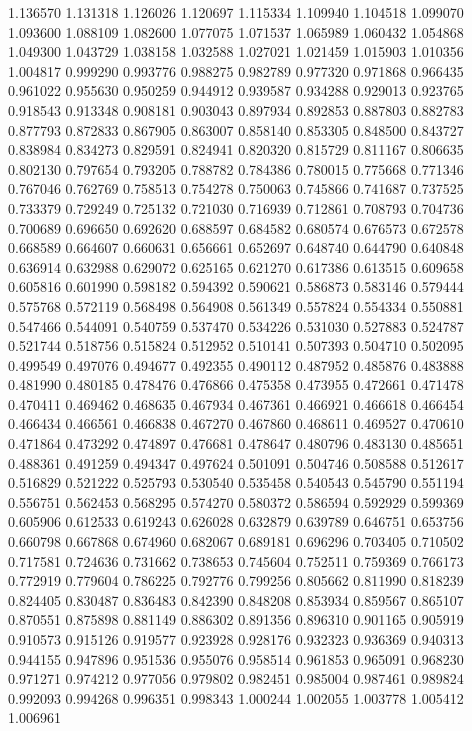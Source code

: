 1.136570
1.131318
1.126026
1.120697
1.115334
1.109940
1.104518
1.099070
1.093600
1.088109
1.082600
1.077075
1.071537
1.065989
1.060432
1.054868
1.049300
1.043729
1.038158
1.032588
1.027021
1.021459
1.015903
1.010356
1.004817
0.999290
0.993776
0.988275
0.982789
0.977320
0.971868
0.966435
0.961022
0.955630
0.950259
0.944912
0.939587
0.934288
0.929013
0.923765
0.918543
0.913348
0.908181
0.903043
0.897934
0.892853
0.887803
0.882783
0.877793
0.872833
0.867905
0.863007
0.858140
0.853305
0.848500
0.843727
0.838984
0.834273
0.829591
0.824941
0.820320
0.815729
0.811167
0.806635
0.802130
0.797654
0.793205
0.788782
0.784386
0.780015
0.775668
0.771346
0.767046
0.762769
0.758513
0.754278
0.750063
0.745866
0.741687
0.737525
0.733379
0.729249
0.725132
0.721030
0.716939
0.712861
0.708793
0.704736
0.700689
0.696650
0.692620
0.688597
0.684582
0.680574
0.676573
0.672578
0.668589
0.664607
0.660631
0.656661
0.652697
0.648740
0.644790
0.640848
0.636914
0.632988
0.629072
0.625165
0.621270
0.617386
0.613515
0.609658
0.605816
0.601990
0.598182
0.594392
0.590621
0.586873
0.583146
0.579444
0.575768
0.572119
0.568498
0.564908
0.561349
0.557824
0.554334
0.550881
0.547466
0.544091
0.540759
0.537470
0.534226
0.531030
0.527883
0.524787
0.521744
0.518756
0.515824
0.512952
0.510141
0.507393
0.504710
0.502095
0.499549
0.497076
0.494677
0.492355
0.490112
0.487952
0.485876
0.483888
0.481990
0.480185
0.478476
0.476866
0.475358
0.473955
0.472661
0.471478
0.470411
0.469462
0.468635
0.467934
0.467361
0.466921
0.466618
0.466454
0.466434
0.466561
0.466838
0.467270
0.467860
0.468611
0.469527
0.470610
0.471864
0.473292
0.474897
0.476681
0.478647
0.480796
0.483130
0.485651
0.488361
0.491259
0.494347
0.497624
0.501091
0.504746
0.508588
0.512617
0.516829
0.521222
0.525793
0.530540
0.535458
0.540543
0.545790
0.551194
0.556751
0.562453
0.568295
0.574270
0.580372
0.586594
0.592929
0.599369
0.605906
0.612533
0.619243
0.626028
0.632879
0.639789
0.646751
0.653756
0.660798
0.667868
0.674960
0.682067
0.689181
0.696296
0.703405
0.710502
0.717581
0.724636
0.731662
0.738653
0.745604
0.752511
0.759369
0.766173
0.772919
0.779604
0.786225
0.792776
0.799256
0.805662
0.811990
0.818239
0.824405
0.830487
0.836483
0.842390
0.848208
0.853934
0.859567
0.865107
0.870551
0.875898
0.881149
0.886302
0.891356
0.896310
0.901165
0.905919
0.910573
0.915126
0.919577
0.923928
0.928176
0.932323
0.936369
0.940313
0.944155
0.947896
0.951536
0.955076
0.958514
0.961853
0.965091
0.968230
0.971271
0.974212
0.977056
0.979802
0.982451
0.985004
0.987461
0.989824
0.992093
0.994268
0.996351
0.998343
1.000244
1.002055
1.003778
1.005412
1.006961
